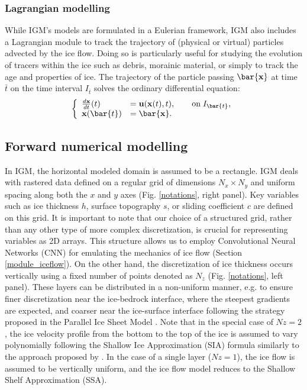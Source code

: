 \documentclass[gmd]{copernicus}
\begin{document}
\subsubsection{Lagrangian modelling}

While IGM's models are formulated in a Eulerian framework, IGM also includes a Lagrangian module to track the trajectory of (physical or virtual) particles advected by the ice flow. Doing so is particularly useful for studying the evolution of tracers within the ice such as debris, morainic material, or simply to track the age and properties of ice. The trajectory 
of the particle passing $\bar{\bf x}$ at time $\bar{t}$ on the
time interval $I_{\bar{t}}$ solves the ordinary differential equation:
\begin{equation}
 \label{pathline}
\left\{
\begin{array}{ll}
\frac{d \bf x}{dt}(t)  & = {\bf u} ( {\bf x}(t), t),  \qquad \text{on} \; I_{\bar{t}}, \\
{\bf x} (\bar{t})  & = \bar{\bf x}.
\end{array} 
\right.
\end{equation} 

\subsection{Forward numerical modelling}

In IGM, the horizontal modeled domain is assumed to be a rectangle. IGM deals with rastered data defined on a regular grid of dimensions $N_x \times N_y$ and uniform spacing along both the $x$ and $y$ axes (Fig. \ref{notations}, right panel). Key variables such as ice thickness $h$, surface topography $s$, or sliding coefficient $c$ are defined on this grid. It is important to note that our choice of a structured grid, rather than any other type of more complex discretization, is crucial for representing variables as 2D arrays. This structure allows us to employ Convolutional Neural Networks (CNN) for emulating the mechanics of ice flow (Section \ref{module_iceflow}). On the other hand, the discretization of ice thickness occurs vertically using a fixed number of points denoted as $N_z$ (Fig. \ref{notations}, left panel). These layers can be distributed in a non-uniform manner, e.g. to ensure finer discretization near the ice-bedrock interface, where the steepest gradients are expected, and coarser near the ice-surface interface following the strategy proposed in the Parallel Ice Sheet Model \citep[PISM,][]{pism-user-manual}. Note that in the special case of $Nz=2$, the ice velocity profile from the bottom to the top of the ice is assumed to vary polynomially following the Shallow Ice Approximation (SIA) formula similarly to the approach proposed by \citet{dias2022new}. In the case of a single layer ($Nz=1$), the ice flow is assumed to be vertically uniform, and the ice flow model reduces to the Shallow Shelf Approximation (SSA).
\end{document}
